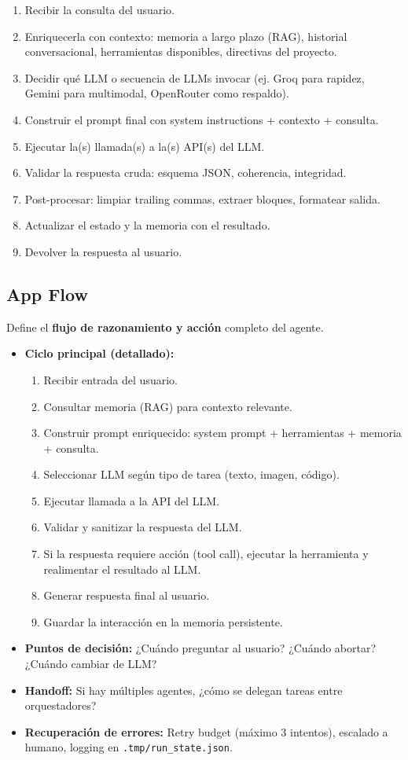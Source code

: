 \documentclass[12pt,a4paper]{article}
\begin{document}
\begin{enumerate}[leftmargin=*]
  \item Recibir la consulta del usuario.
  \item Enriquecerla con contexto: memoria a largo plazo (RAG), historial conversacional, herramientas disponibles, directivas del proyecto.
  \item Decidir qué LLM o secuencia de LLMs invocar (ej. Groq para rapidez, Gemini para multimodal, OpenRouter como respaldo).
  \item Construir el prompt final con system instructions + contexto + consulta.
  \item Ejecutar la(s) llamada(s) a la(s) API(s) del LLM.
  \item Validar la respuesta cruda: esquema JSON, coherencia, integridad.
  \item Post-procesar: limpiar trailing commas, extraer bloques, formatear salida.
  \item Actualizar el estado y la memoria con el resultado.
  \item Devolver la respuesta al usuario.
\end{enumerate}

\subsection{App Flow}

Define el \textbf{flujo de razonamiento y acción} completo del agente.

\begin{itemize}[leftmargin=*]
  \item \textbf{Ciclo principal (detallado):}
  \begin{enumerate}
    \item Recibir entrada del usuario.
    \item Consultar memoria (RAG) para contexto relevante.
    \item Construir prompt enriquecido: system prompt + herramientas + memoria + consulta.
    \item Seleccionar LLM según tipo de tarea (texto, imagen, código).
    \item Ejecutar llamada a la API del LLM.
    \item Validar y sanitizar la respuesta del LLM.
    \item Si la respuesta requiere acción (tool call), ejecutar la herramienta y realimentar el resultado al LLM.
    \item Generar respuesta final al usuario.
    \item Guardar la interacción en la memoria persistente.
  \end{enumerate}
  \item \textbf{Puntos de decisión:} ¿Cuándo preguntar al usuario? ¿Cuándo abortar? ¿Cuándo cambiar de LLM?
  \item \textbf{Handoff:} Si hay múltiples agentes, ¿cómo se delegan tareas entre orquestadores?
  \item \textbf{Recuperación de errores:} Retry budget (máximo 3 intentos), escalado a humano, logging en \texttt{.tmp/run\_state.json}.
\end{itemize}
\end{document}
